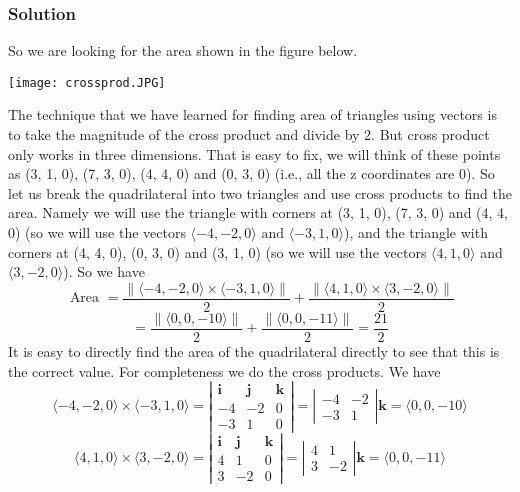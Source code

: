 \documentclass{article}
\begin{document}
\subsubsection*{Solution}
So we are looking for the area shown in the figure below.
\begin{center}
    \texttt{[image: crossprod.JPG]}
\end{center}
The technique that we have learned for finding area of triangles using vectors is to take the magnitude of the cross product and divide by 2. But cross product only works in three dimensions. That is easy to fix, we will think of these points as (3, 1, 0), (7, 3, 0), (4, 4, 0) and (0, 3, 0) (i.e., all the z coordinates are 0). So let us break the quadrilateral into two triangles and use cross products to find the area. Namely we will use the triangle with corners at (3, 1, 0), (7, 3, 0) and (4, 4, 0) (so we will use the vectors $\langle-4,-2,0\rangle \text{ and } \langle-3,1,0\rangle$), and the triangle with corners at (4, 4, 0), (0, 3, 0) and (3, 1, 0) (so we will use the vectors $\langle 4,1,0\rangle$ and $\langle 3,-2,0\rangle$). So we have
$$
\text { Area }=\frac{\|\langle-4,-2,0\rangle \times\langle-3,1,0\rangle\|}{2}+\frac{\|\langle 4,1,0\rangle \times\langle 3,-2,0\rangle\|}{2}
$$
$$
=\frac{\|\langle 0,0,-10\rangle\|}{2}+\frac{\|\langle 0,0,-11\rangle\|}{2}=\boxed{ \frac{21}{2} }
$$
It is easy to directly find the area of the quadrilateral directly to see that this is the correct value. For completeness we do the cross products. We have
$$
\langle-4,-2,0\rangle \times\langle-3,1,0\rangle=\left|\begin{array}{ccc}
\mathbf{i} & \mathbf{j} & \mathbf{k} \\
-4 & -2 & 0 \\
-3 & 1 & 0
\end{array}\right|=\left|\begin{array}{cc}
-4 & -2 \\
-3 & 1
\end{array}\right| \mathbf{k}=\langle 0,0,-10\rangle
$$
$$
\langle 4,1,0\rangle \times\langle 3,-2,0\rangle=\left|\begin{array}{ccc}
\mathbf{i} & \mathbf{j} & \mathbf{k} \\
4 & 1 & 0 \\
3 & -2 & 0
\end{array}\right|=\left|\begin{array}{cc}
4 & 1 \\
3 & -2
\end{array}\right| \mathbf{k}=\langle 0,0,-11\rangle
$$
\end{document}
